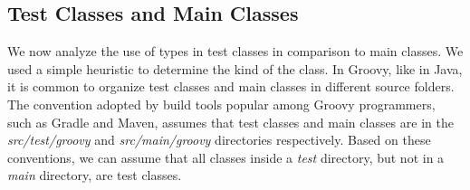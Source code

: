 \documentclass[]{sigplanconf}
\begin{document}
% 
% 
% 





\subsection{Test Classes and Main Classes\label{sec:results-tests}}
We now analyze the use of types in test classes in comparison to main classes.
We used a simple heuristic to determine the kind of the class.
In Groovy, like in Java, it is common to organize test classes and main classes in different source folders.
The convention adopted by build tools popular among Groovy programmers, such as Gradle and Maven, assumes that test classes and main classes are in the \emph{src/test/groovy} and \emph{src/main/groovy} directories respectively.
Based on these conventions, we can assume that all classes inside a \emph{test} directory, but not in a \emph{main} directory, are test classes.
\end{document}
